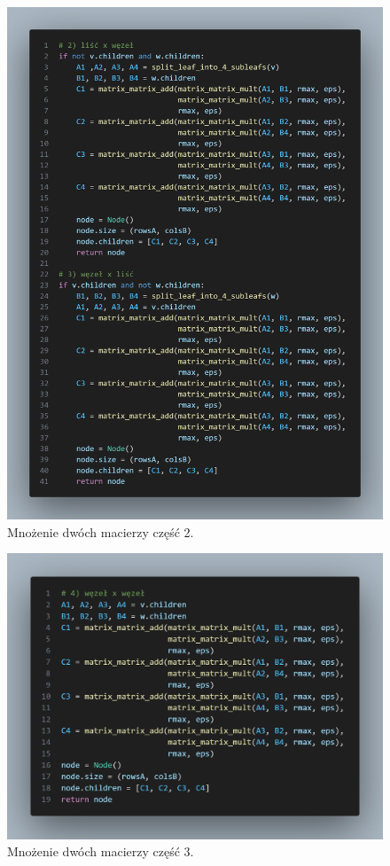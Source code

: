 \documentclass[11pt, leqno]{scrartcl}
\begin{document}
    \begin{figure}[H]
        \centering
        \includegraphics[width=1\linewidth]{matrix_matrix2.png}
        \caption{Mnożenie dwóch macierzy część 2.}
    \end{figure}
    \begin{figure}[H]
        \centering
        \includegraphics[width=1\linewidth]{matrix_matrix3.png}
        \caption{Mnożenie dwóch macierzy część 3.}
    \end{figure}
    
\end{document}
